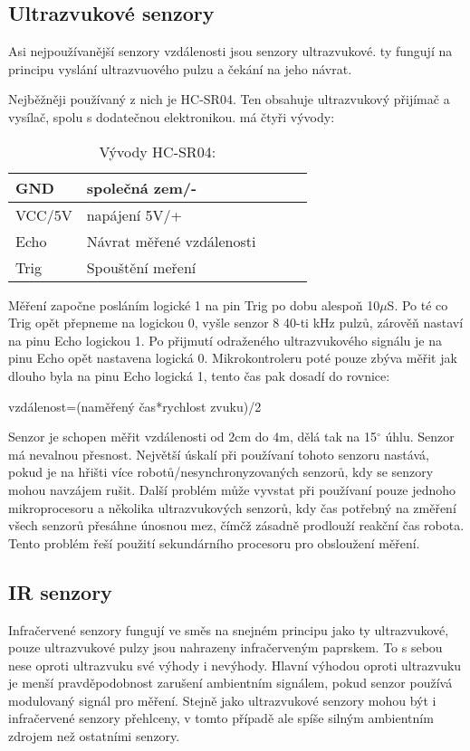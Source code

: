\subsection{Ultrazvukové senzory}

Asi nejpoužívanější senzory vzdálenosti jsou senzory ultrazvukové. ty fungují na principu vyslání ultrazvuového pulzu a čekání na jeho návrat.


Nejběžněji používaný z nich je HC-SR04. 
Ten obsahuje ultrazvukový přijímač a vysílač, spolu s dodatečnou elektronikou.
má čtyři vývody: 
\begin{table}[]
	\caption{Vývody HC-SR04:}
	\centering
	\begin{tabular}{|l|l|l|l|l|} \hline
		GND & společná zem/-   \\ \hline
		VCC/5V & napájení 5V/+  \\ \hline
		Echo & Návrat měřené vzdálenosti   \\ \hline
		Trig & Spouštění meření \\ \hline
	\end{tabular}
\end{table}
Měření započne posláním logické 1 na pin Trig po dobu alespoň 10$\mu$S.
Po té co Trig opět přepneme na logickou 0, vyšle senzor 8 40-ti kHz pulzů, zárověň nastaví na pinu Echo logickou 1.
Po přijmutí odraženého ultrazvukového signálu je na pinu Echo opět nastavena logická 0.
Mikrokontroleru poté pouze zbýva měřit jak dlouho byla na pinu Echo logická 1, tento čas pak dosadí do rovnice:
\begin{center}
    vzdálenost=(naměřený čas*rychlost zvuku)/2
\end{center} 
Senzor je schopen měřit vzdálenosti od 2cm do 4m, dělá tak na 15$^{\circ}$ úhlu.
Senzor má nevalnou přesnost.
Největší úskalí při používaní tohoto senzoru nastává, pokud je na hřišti více robotů/nesynchronyzovaných senzorů, kdy se senzory mohou navzájem rušit.
Další problém může vyvstat při používaní pouze jednoho mikroprocesoru a několika ultrazvukových senzorů, kdy čas potřebný na změření všech senzorů přesáhne únosnou mez, čímčž zásadně prodlouží reakční čas robota.
Tento problém řeší použití sekundárního procesoru pro obsloužení měření.
\cite{hc-sr04}

\subsection{IR senzory}
Infračervené senzory fungují ve směs na snejném principu jako ty ultrazvukové, pouze ultrazvukové pulzy jsou nahrazeny infračerveným paprskem.
To s sebou nese oproti ultrazvuku své výhody i nevýhody.
Hlavní výhodou oproti ultrazvuku je menší pravděpodobnost zarušení ambientním signálem, pokud senzor používá modulovaný signál pro měření.
Stejně jako ultrazvukové senzory mohou být i infračervené senzory přehlceny, v tomto případě ale spíše silným ambientním zdrojem než ostatními senzory.

